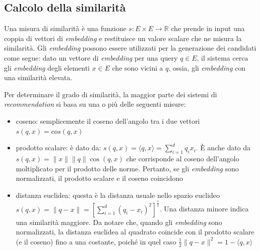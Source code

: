 \subsection{Calcolo della similarità}

Una misura di similarità è una funzione $s: E \times E \to \mathbb{R}$ che prende in input una coppia di vettori di \textit{embedding} e restituisce un valore scalare che ne misura la similarità. Gli \textit{embedding} possono essere utilizzati per la generazione dei candidati come segue: dato un vettore di \textit{embedding} per una query $q \in E$, il sistema cerca gli \textit{embedding} degli elementi $x \in E$ che sono vicini a $q$, ossia, gli \textit{embedding} con una similarità elevata.

Per determinare il grado di similarità, la maggior parte dei sistemi di \textit{recommendation} si basa su una o più delle seguenti misure:

\begin{itemize}
    \item coseno: semplicemente il coseno dell'angolo tra i due vettori $s(q, x) = cos(q, x)$
    \item prodotto scalare: è dato da: $s(q, x) = \langle q, x \rangle = \sum\limits_{i=1}^{d} q_i x_i$. È anche dato da $s(q, x) = \|x\| \|q\| \cos(q, x)$ che corrisponde al coseno dell'angolo moltiplicato per il prodotto delle norme. Pertanto, se gli \textit{embedding} sono normalizzati, il prodotto scalare e il coseno coincidono    
    \item distanza euclidea: questa è la distanza usuale nello spazio euclideo $s(q, x) = \|q - x\| = \left[ \sum\limits_{i=1}^{d} (q_i - x_i)^2 \right]^{\frac{1}{2}}$. Una distanza minore indica una similarità maggiore. Da notare che, quando gli \textit{embedding} sono normalizzati, la distanza euclidea al quadrato coincide con il prodotto scalare (e il coseno) fino a una costante, poiché in quel caso $\frac{1}{2} \|q - x\|^2 = 1 - \langle q, x \rangle$
\end{itemize}


